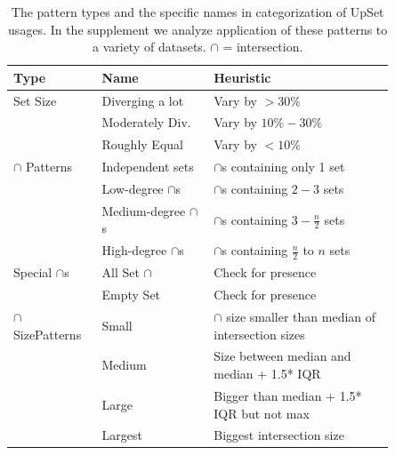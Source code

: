 \documentclass{egpubl}
\begin{document}
\begin{table}[t]
    \centering
    \caption{The pattern types and the specific names in categorization of UpSet usages. In the supplement we analyze application of these patterns to a variety of datasets. $\cap$ = intersection.
    }
    \small
    \begin{tabular}{p{0.17\linewidth}p{0.26\linewidth}p{0.42\linewidth}}
        \textbf{Type}                     & \textbf{Name}                  & \textbf{Heuristic}                                          \\
        \toprule
        Set Size
                                          & Diverging a lot                & Vary by $>30\%$                                             \\
                                          & Moderately Div.                & Vary by $10\% - 30\%$                                       \\
                                          & Roughly Equal                  & Vary by  $<10\%$                                            \\


        \midrule

        $\cap$ Patterns                   & Independent sets               & $\cap$s containing only 1 set                               \\
                                          & Low-degree $\cap$s             & $\cap$s containing $2-3$ sets                               \\
                                          & Medium-degree $\cap$s          & $\cap$s containing $3-\frac{n}{2}$ sets                     \\
                                          & High-degree $\cap$s            & $\cap$s containing $\frac{n}{2}$ to $n$ sets                \\
        \midrule

        Special $\cap$s                   & All Set $\cap$                 & Check for presence                                          \\
                                          & Empty Set                      & Check for presence                                          \\
        \midrule

        $\cap$ Size\newline Patterns      & Small                          & $\cap$ size smaller than median of intersection sizes       \\
                                          & Medium                         & Size between median and median + 1.5* IQR                   \\
& Large                          & Bigger than median + 1.5* IQR but not max                   \\
                                          & Largest                        & Biggest intersection size                                   \\
        \midrule


\end{tabular}
\end{table}
\end{document}
